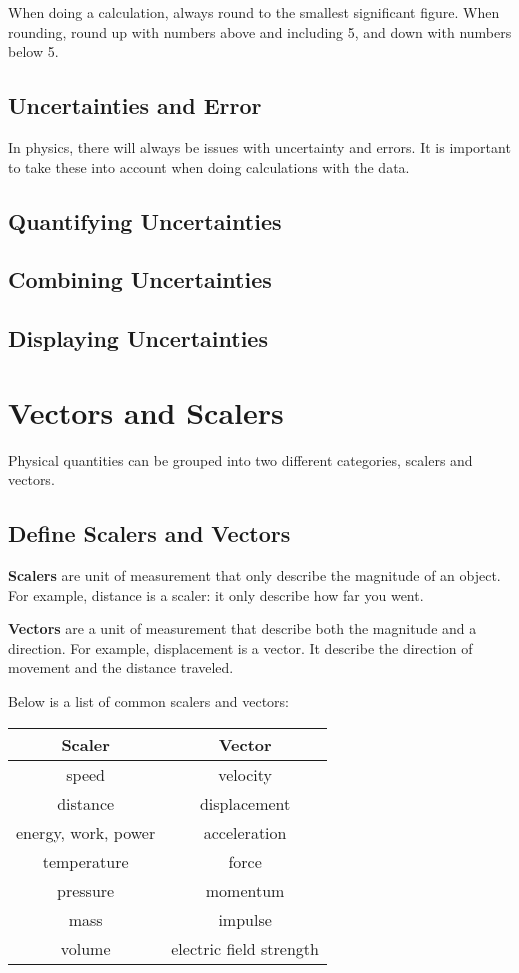 \documentclass[../notes.tex]{subfiles}
\begin{document}
When doing a calculation, always round to the smallest significant figure.
When rounding, round up with numbers above and including 5, and down with numbers below 5.

\subsection{Uncertainties and Error}
In physics, there will always be issues with uncertainty and errors.
It is important to take these into account when doing calculations with the data.

\subsection{Quantifying Uncertainties}

\subsection{Combining Uncertainties}

\subsection{Displaying Uncertainties}

\section{Vectors and Scalers}
Physical quantities can be grouped into two different categories, scalers and vectors.

\subsection{Define Scalers and Vectors}
\textbf{Scalers} are unit of measurement that only describe the magnitude of an object.
For example, distance is a scaler: it only describe how far you went.

\textbf{Vectors} are a unit of measurement that describe both the magnitude and a direction.
For example, displacement is a vector. 
It describe the direction of movement and the distance traveled.

Below is a list of common scalers and vectors:

\begin{center}
	\begin{tabular}{c|c}
		Scaler & Vector \\ 
		\hline
		speed & velocity \\
		distance & displacement \\
		energy, work, power & acceleration \\
		temperature & force \\
		pressure & momentum \\
		mass & impulse \\
		volume & electric field strength \\
	\end{tabular}
\end{center}
\end{document}
